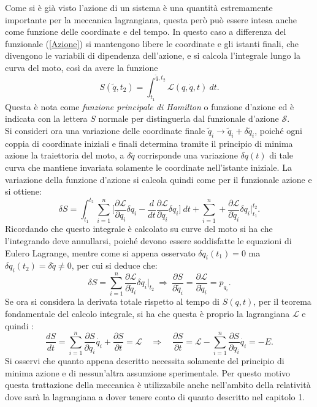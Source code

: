Come si è già visto l'azione di un sistema è una quantità estremamente importante per la meccanica lagrangiana, questa però può essere intesa anche come funzione delle coordinate e del tempo. In questo caso a differenza del funzionale (\ref{Azione}) si mantengono libere le coordinate e gli istanti finali, che divengono le variabili di dipendenza dell'azione, e si calcola l'integrale lungo la curva del moto, così da avere la funzione
\begin{equation}
    S (\tilde q,t_2)=\int_{t_1}^{\tilde q,t_2} \mathcal{L} (q,\dot q,t)\ dt.
\end{equation}
Questa è nota come \emph{funzione principale di Hamilton} o funzione d'azione ed è indicata con la lettera $S$ normale per distinguerla dal funzionale d'azione $\mathcal{S} $.\\
Si consideri ora una variazione delle coordinate finale $\tilde q_i\rightarrow \tilde q_i+\delta \tilde q_i$, poiché ogni coppia di coordinate iniziali e finali determina tramite il principio di minima azione la traiettoria del moto, a $\delta \tilde q$ corrisponde una variazione $\delta q(t)$ di tale curva che mantiene invariata solamente le coordinate nell'istante iniziale. La variazione della funzione d'azione si calcola quindi come per il funzionale azione e si ottiene:
\begin{equation*}
    \delta S=\int_{t_1}^{t_2}\sum_{i=1}^{n}\bigg[\frac{\partial\mathcal{L} }{\partial \dot  q_i}\delta q_i-\frac{d}{dt}\frac{\partial\mathcal{L} }{\partial \dot{q}_i}\delta q_i \bigg]\ dt+\sum_{i=1}^n+\frac{\partial\mathcal{L} }{\partial \dot q_i}\delta q_i\bigg|_{t_1}^{t_2}.
\end{equation*}
Ricordando che questo integrale è calcolato su curve del moto si ha che l'integrando deve annullarsi, poiché devono essere soddisfatte le equazioni di Eulero Lagrange, mentre come si appena osservato $\delta q_i(t_1)=0$ ma $\delta q_i(t_2)=\delta \tilde q\neq0$, per cui si deduce che:
\begin{equation*}
    \delta S=\sum_{i=1}^n\frac{\partial\mathcal{L} }{\partial \dot q_i}\delta q_i\bigg|_{t_2}\ \Rightarrow\ \frac{\partial S}{\partial \tilde q_i}= \frac{\partial\mathcal{L} }{\partial \dot q_i}=p_{q_i}.
\end{equation*}
Se ora si considera la derivata totale rispetto al tempo di $S(q,t)$, per il teorema fondamentale del calcolo integrale, si ha che questa è proprio la lagrangiana $\mathcal{L} $ e quindi :
\begin{equation*}
    \frac{dS}{dt}=\sum_{i=1}^n\frac{\partial S }{\partial  q_i}\dot{q_i}+\frac{\partial S }{\partial t}=\mathcal{L}\quad \Rightarrow\quad \frac{\partial S }{\partial t}=\mathcal{L} -\sum_{i=1}^n\frac{\partial S }{\partial  q_i}\dot{q_i}=-E.
\end{equation*}
Si osservi che quanto appena descritto necessita solamente del principio di minima azione e di nessun'altra assunzione sperimentale. Per questo motivo questa trattazione della meccanica è utilizzabile anche nell'ambito della relatività dove sarà la lagrangiana a dover tenere conto di quanto descritto nel capitolo 1.